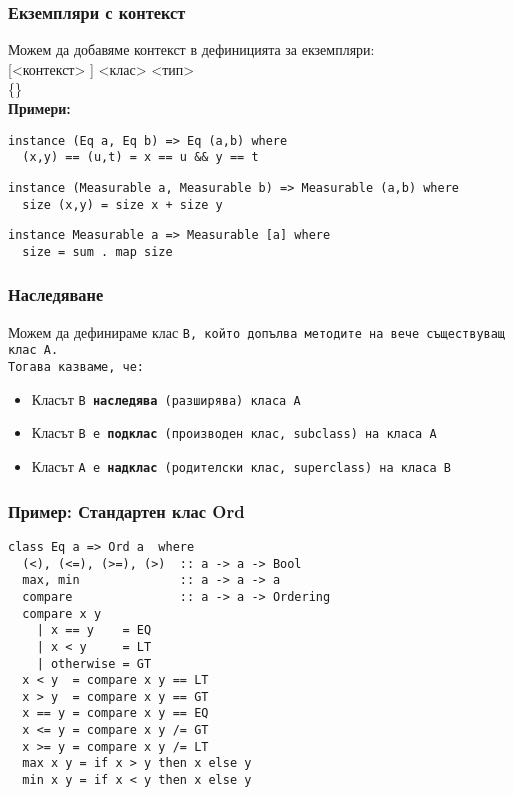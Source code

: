 \documentclass[alsotrans]{beamerswitch}
\begin{document}
\begin{frame}[fragile]
  \frametitle{Екземпляри с контекст}
  Можем да добавяме контекст в дефиницията за екземпляри:\\
   [<контекст> \tta{=>}] <клас> <тип> \\
  \hspace{1em} \{<дефиниция-на-метод>\}\\[2ex]
  \pause
  \textbf{Примери:}
\small
\begin{lstlisting}
instance (Eq a, Eq b) => Eq (a,b) where
  (x,y) == (u,t) = x == u && y == t
\end{lstlisting}
  \pause
\begin{lstlisting}
instance (Measurable a, Measurable b) => Measurable (a,b) where
  size (x,y) = size x + size y
\end{lstlisting}
  \pause
\begin{lstlisting}
instance Measurable a => Measurable [a] where
  size = sum . map size
\end{lstlisting}
\end{frame}

\begin{frame}[fragile]
  \frametitle{Наследяване}
  Можем да дефинираме клас \tt{B}, който допълва методите на вече съществуващ клас \tt{A}.\\
  Тогава казваме, че:
  \begin{itemize}[<+->]
  \item Класът \tt{B} \textbf{наследява} (разширява) класа \tt{A}
  \item Класът \tt{B} е \textbf{подклас} (производен клас, subclass) на класа \tt{A}
  \item Класът \tt{A} е \textbf{надклас} (родителски клас, superclass) на класа \tt{B}
  \end{itemize}
\end{frame}

\begin{frame}[fragile]
  \frametitle{Пример: Стандартен клас Ord}
\begin{lstlisting}
class Eq a => Ord a  where
  (<), (<=), (>=), (>)  :: a -> a -> Bool
  max, min              :: a -> a -> a
  compare               :: a -> a -> Ordering
  compare x y
    | x == y    = EQ
    | x < y     = LT
    | otherwise = GT
  x < y  = compare x y == LT
  x > y  = compare x y == GT
  x == y = compare x y == EQ
  x <= y = compare x y /= GT
  x >= y = compare x y /= LT
  max x y = if x > y then x else y
  min x y = if x < y then x else y
\end{lstlisting}
\end{frame}
\end{document}
